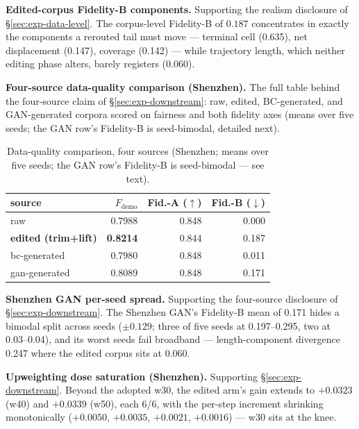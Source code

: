 \textbf{Edited-corpus Fidelity-B components.} Supporting the realism
disclosure of \S\ref{sec:exp-data-level}. The corpus-level Fidelity-B of
$0.187$ concentrates in exactly the components a rerouted tail must move ---
terminal cell (0.635), net displacement (0.147), coverage (0.142) --- while
trajectory length, which neither editing phase alters, barely registers
(0.060).

\textbf{Four-source data-quality comparison (Shenzhen).} The full table behind
the four-source claim of \S\ref{sec:exp-downstream}: raw, edited, BC-gen\-er\-ated,
and GAN-generated corpora scored on fairness and both fidelity axes (means over
five seeds; the GAN row's Fidelity-B is seed-bimodal, detailed next).
\begin{table}[t]
\caption{Data-quality comparison, four sources (Shenzhen; means over five
seeds; the GAN row's Fidelity-B is seed-bimodal --- see text).}
\label{tab:l1}
\small
\begin{tabular}{lrrr}
\toprule
source & $F_{\mathrm{demo}}$ & Fid.-A ($\uparrow$) & Fid.-B ($\downarrow$) \\
\midrule
raw & 0.7988 & 0.848 & 0.000 \\
\textbf{edited (trim+lift)} & \textbf{0.8214} & 0.844 & 0.187 \\
bc-generated & 0.7980 & 0.848 & 0.011 \\
gan-generated & 0.8089 & 0.848 & 0.171 \\
\bottomrule
\end{tabular}
\end{table}

\textbf{Shenzhen GAN per-seed spread.} Supporting the four-source
disclosure of \S\ref{sec:exp-downstream}. The Shenzhen GAN's Fidelity-B mean
of 0.171 hides a bimodal split across seeds ($\pm 0.129$; three of five
seeds at 0.197--0.295, two at 0.03--0.04), and its worst seeds fail
broadband --- length-component divergence 0.247 where the edited corpus sits
at 0.060.

\textbf{Upweighting dose saturation (Shenzhen).} Supporting
\S\ref{sec:exp-downstream}. Beyond the adopted w30, the edited arm's gain
extends to $+0.0323$ (w40) and $+0.0339$ (w50), each 6/6, with the per-step
increment shrinking monotonically ($+0.0050$, $+0.0035$, $+0.0021$,
$+0.0016$) --- w30 sits at the knee.

